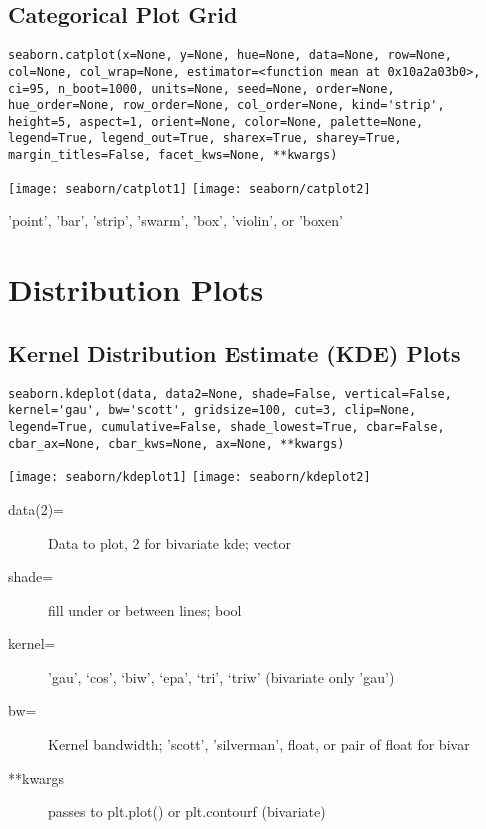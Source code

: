 \subsection{Categorical Plot Grid}
\begin{verbatim}
seaborn.catplot(x=None, y=None, hue=None, data=None, row=None, 
col=None, col_wrap=None, estimator=<function mean at 0x10a2a03b0>,
ci=95, n_boot=1000, units=None, seed=None, order=None, 
hue_order=None, row_order=None, col_order=None, kind='strip', 
height=5, aspect=1, orient=None, color=None, palette=None, 
legend=True, legend_out=True, sharex=True, sharey=True, 
margin_titles=False, facet_kws=None, **kwargs)
\end{verbatim}
\texttt{[image: seaborn/catplot1]}
\texttt{[image: seaborn/catplot2]}
\begin{description}[itemsep=0.25pt]
	\item[kind=] 'point', 'bar', 'strip', 'swarm', 'box', 'violin', or 'boxen'
\end{description}

\section{Distribution Plots}

\subsection{Kernel Distribution Estimate (KDE) Plots}
\begin{verbatim}
seaborn.kdeplot(data, data2=None, shade=False, vertical=False, 
kernel='gau', bw='scott', gridsize=100, cut=3, clip=None, 
legend=True, cumulative=False, shade_lowest=True, cbar=False, 
cbar_ax=None, cbar_kws=None, ax=None, **kwargs)
\end{verbatim}
\texttt{[image: seaborn/kdeplot1]}
\texttt{[image: seaborn/kdeplot2]}
\begin{description}
	\item[data(2)=] Data to plot, 2 for bivariate kde; vector
	\item[shade=] fill under or between lines; bool
	\item[kernel=] 'gau’, ‘cos’, ‘biw’, ‘epa’, ‘tri’, ‘triw’  (bivariate only 'gau')
	\item[bw=] Kernel bandwidth; 'scott', 'silverman', float, or pair of float for bivar
	\item[**kwargs] passes to plt.plot() or plt.contour{f} (bivariate)
\end{description}

